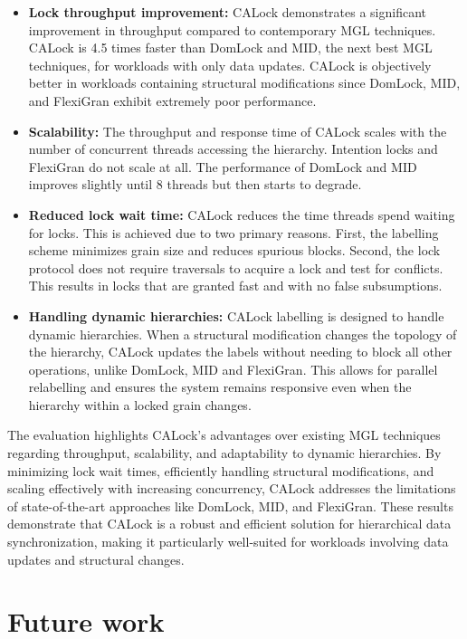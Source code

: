 \begin{itemize}
    \item \textbf{Lock throughput improvement:} CALock demonstrates a significant improvement in throughput compared to contemporary MGL techniques. CALock is 4.5 times faster than DomLock and MID, the next best MGL techniques, for workloads with only data updates. CALock is objectively better in workloads containing structural modifications since DomLock, MID, and FlexiGran exhibit extremely poor performance. 

    \item \textbf{Scalability:} The throughput and response time of CALock scales with the number of concurrent threads accessing the hierarchy. Intention locks and FlexiGran do not scale at all. The performance of DomLock and MID improves slightly until 8 threads but then starts to degrade. 
    
    \item \textbf{Reduced lock wait time:} CALock reduces the time threads spend waiting for locks. This is achieved due to two primary reasons. First, the labelling scheme minimizes grain size and reduces spurious blocks. Second, the lock protocol does not require traversals to acquire a lock and test for conflicts. This results in locks that are granted fast and with no false subsumptions. 

    \item \textbf{Handling dynamic hierarchies:} CALock labelling is designed to handle dynamic hierarchies. When a structural modification changes the topology of the hierarchy, CALock updates the labels without needing to block all other operations, unlike DomLock, MID and FlexiGran. This allows for parallel relabelling and ensures the system remains responsive even when the hierarchy within a locked grain changes.  
\end{itemize}


The evaluation highlights CALock's advantages over existing MGL techniques regarding throughput, scalability, and adaptability to dynamic hierarchies. By minimizing lock wait times, efficiently handling structural modifications, and scaling effectively with increasing concurrency, CALock addresses the limitations of state-of-the-art approaches like DomLock, MID, and FlexiGran. These results demonstrate that CALock is a robust and efficient solution for hierarchical data synchronization, making it particularly well-suited for workloads involving data updates and structural changes.


\section{Future work}

